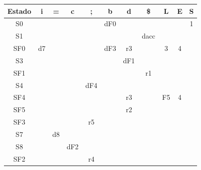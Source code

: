 \begin{problem}
\begin{tabular}{| c | c | c | c | c | c | c | c | c | c | c | }
\hline
Estado  & i & = & c & ; & b & d & \$ & L & E & S \\
\hline
S0 &  &  &  &  & dF0 &  &  &  &  & 1\\
\hline
S1 &  &  &  &  &  &  & dacc &  &  & \\
\hline
SF0 & d7 &  &  &  & dF3 & r3 &  & 3 & 4 & \\
\hline
S3 &  &  &  &  &  & dF1 &  &  &  & \\
\hline
SF1 &  &  &  &  &  &  & r1 &  &  & \\
\hline
S4 &  &  &  & dF4 &  &  &  &  &  & \\
\hline
SF4 &  &  &  &  &  & r3 &  & F5 & 4 & \\
\hline
SF5 &  &  &  &  &  & r2 &  &  &  & \\
\hline
SF3 &  &  &  & r5 &  &  &  &  &  & \\
\hline
S7 &  & d8 &  &  &  &  &  &  &  & \\
\hline
S8 &  &  & dF2 &  &  &  &  &  &  & \\
\hline
SF2 &  &  &  & r4 &  &  &  &  &  & \\
\hline
\end{tabular}

\end{problem}

